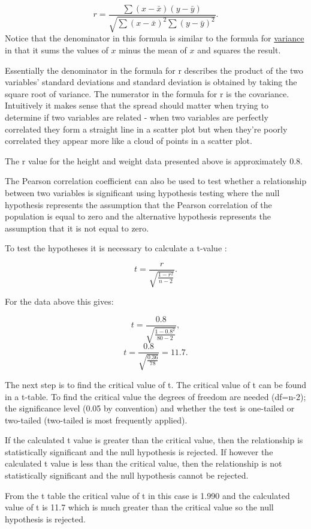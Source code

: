 \documentclass[
]{book}
\begin{document}
\[r=\frac{\sum{(x-\bar{x})(y-\bar{y})}}{\sqrt{\sum{(x-\bar{x})^2}\sum{(y-\bar{y})^2}}}.\]
Notice that the denominator in this formula is similar to the formula for \protect\hyperlink{varr}{variance} in that it sums the values of \(x\) minus the mean of \(x\) and squares the result.

Essentially the denominator in the formula for r describes the product of the two variables' standard deviations and standard deviation is obtained by taking the square root of variance. The numerator in the formula for r is the covariance. Intuitively it makes sense that the spread should matter when trying to determine if two variables are related - when two variables are perfectly correlated they form a straight line in a scatter plot but when they're poorly correlated they appear more like a cloud of points in a scatter plot.

The r value for the height and weight data presented above is approximately 0.8.

The Pearson correlation coefficient can also be used to test whether a relationship between two variables is significant using hypothesis testing where the null hypothesis represents the assumption that the Pearson correlation of the population is equal to zero and the alternative hypothesis represents the assumption that it is not equal to zero.

To test the hypotheses it is necessary to calculate a t-value \citep{swinscow2}:

\[t=\frac{r}{\sqrt{\frac{1-r^2}{n-2}}}.\]

For the data above this gives:

\[t=\frac{0.8}{\sqrt{\frac{1-0.8^2}{80-2}}},\]
\[t=\frac{0.8}{\sqrt{\frac{0.36}{78}}}= 11.7.\]

The next step is to find the critical value of t. The critical value of t can be found in a t-table. To find the critical value the degrees of freedom are needed (df=n-2); the significance level (0.05 by convention) and whether the test is one-tailed or two-tailed (two-tailed is most frequently applied).

If the calculated t value is greater than the critical value, then the relationship is statistically significant and the null hypothesis is rejected. If however the calculated t value is less than the critical value, then the relationship is not statistically significant and the null hypothesis cannot be rejected.

From the t table the critical value of t in this case is 1.990 and the calculated value of t is 11.7 which is much greater than the critical value so the null hypothesis is rejected.
\end{document}
